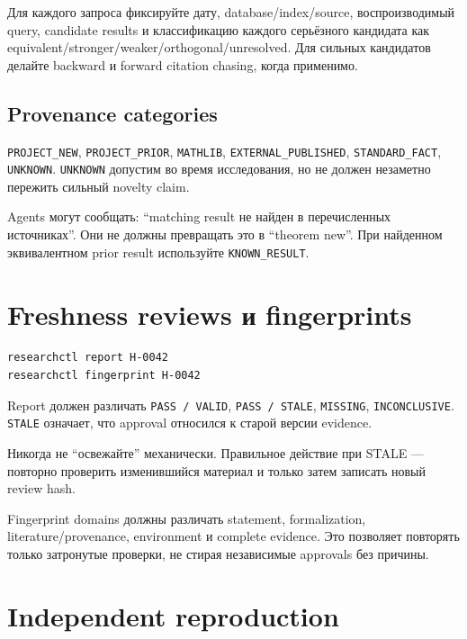 \documentclass[11pt,a4paper]{article}
\newcommand{\status}[1]{\texttt{#1}}
\begin{document}
Для каждого запроса фиксируйте дату, database/index/source, воспроизводимый query, candidate results и классификацию каждого серьёзного кандидата как equivalent/stronger/weaker/orthogonal/unresolved. Для сильных кандидатов делайте backward и forward citation chasing, когда применимо.

\subsection{Provenance categories}

\status{PROJECT\_NEW}, \status{PROJECT\_PRIOR}, \status{MATHLIB}, \status{EXTERNAL\_PUBLISHED}, \status{STANDARD\_FACT}, \status{UNKNOWN}. \status{UNKNOWN} допустим во время исследования, но не должен незаметно пережить сильный novelty claim.

Agents могут сообщать: ``matching result не найден в перечисленных источниках''. Они не должны превращать это в ``theorem new''. При найденном эквивалентном prior result используйте \status{KNOWN\_RESULT}.

\section{Freshness reviews и fingerprints}

\begin{lstlisting}
researchctl report H-0042
researchctl fingerprint H-0042
\end{lstlisting}

Report должен различать \texttt{PASS / VALID}, \texttt{PASS / STALE}, \texttt{MISSING}, \texttt{INCONCLUSIVE}. \texttt{STALE} означает, что approval относился к старой версии evidence.

\begin{dangerbox}
Никогда не ``освежайте'' \texttt{} механически. Правильное действие при STALE --- повторно проверить изменившийся материал и только затем записать новый review hash.
\end{dangerbox}

Fingerprint domains должны различать statement, formalization, literature/provenance, environment и complete evidence. Это позволяет повторять только затронутые проверки, не стирая независимые approvals без причины.

\section{Independent reproduction}
\end{document}
